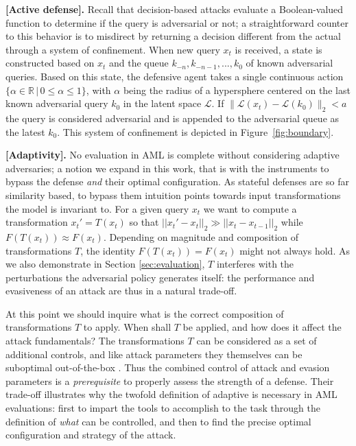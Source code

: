\textbf{[Active defense].} Recall that decision-based attacks evaluate a Boolean-valued function to determine if the query is adversarial or not; a straightforward counter to this behavior is to misdirect by returning a decision different from the actual through a system of confinement.
When new query $x_t$ is received, a state is constructed based on $x_t$ and the queue $k_{-n}, k_{-n-1}, ..., k_{0}$ of known adversarial queries.
Based on this state, the defensive agent takes a single continuous action $\{\alpha \in \mathbb{R} \,|\, 0\leq \alpha \leq1\}$, with $\alpha$ being the radius of a hypersphere centered on the last known adversarial query $k_0$ in the latent space $\mathcal{L}$.
If $\|\mathcal{L}(x_t) - \mathcal{L}(k_0)\|_2 < a$ the query is considered adversarial and is appended to the adversarial queue as the latest $k_0$.
This system of confinement is depicted in Figure~\ref{fig:boundary}.

\textbf{[Adaptivity].} No evaluation in \gls{AML} is complete without considering adaptive adversaries; a notion we expand in this work, that is with the instruments to bypass the defense \textit{and} their optimal configuration.
As stateful defenses are so far similarity based, to bypass them intuition points towards input transformations the model is invariant to.
For a given query $x_t$ we want to compute a transformation $x_t' = T(x_t)$ so that $||x_t' - x_t||_2 \gg ||x_t - x_{t-1}||_2$ while $F(T(x_t)) \approx F(x_t)$.
Depending on magnitude and composition of transformations $T$, the identity $F(T(x_t)) = F(x_t)$ might not always hold.
As we also demonstrate in Section \ref{sec:evaluation}, $T$ interferes with the perturbations the adversarial policy generates itself: the performance and evasiveness of an attack are thus in a natural trade-off.

At this point we should inquire what is the correct composition of transformations $T$ to apply.
When shall $T$ be applied, and how does it affect the attack fundamentals?
The transformations $T$ can be considered as a set of additional controls, and like attack parameters they themselves can be suboptimal out-of-the-box \cite{croce2020reliable}.
Thus the combined control of attack and evasion parameters is a \emph{prerequisite} to properly assess the strength of a defense.
Their trade-off illustrates why the twofold definition of adaptive is necessary in \gls{AML} evaluations: first to impart the tools to accomplish to the task through the definition of \textit{what} can be controlled, and then to find the precise optimal configuration and strategy of the attack.

